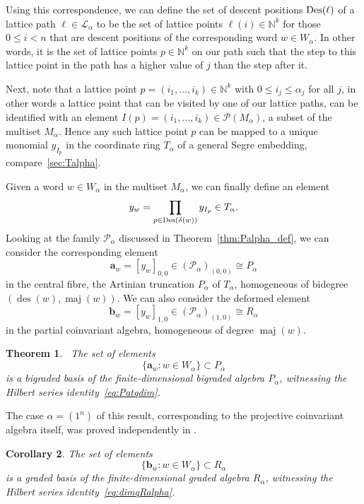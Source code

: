 \documentclass[a4paper,11pt]{amsart}
\theoremstyle{plain}
\newtheorem{theorem}{Theorem}[section]
\newtheorem{corollary}[theorem]{Corollary}
\theoremstyle{definition}
\newcommand{\N}{\mathbb{N}}
\newcommand{\CP}{\mathscr{P}}
\DeclareMathOperator{\maj}{maj}
\DeclareMathOperator{\des}{des}
\begin{document}
Using this correspondence, we can define the set of descent positions ${\rm Des}(\ell)$ of a lattice path $\ell\in{\mathcal L}_\alpha$ to be the set of lattice points $\ell(i)\in \N^k$ for those $0\leq i <n$ that are descent positions of the corresponding word $w\in W_{\alpha}$. In other words, it is the set of lattice points $p\in \N^k$ on our path such that the step to this lattice point in the path has a higher value of $j$ than the step after it. 

Next, note that a lattice point $p=(i_1, \ldots, i_k)\in \N^k$ with $0\leq i_j\leq \alpha_j$ for all $j$, in other
words a lattice point that can be visited by one of our lattice paths, can be identified with an element
$I(p)=(i_1,\ldots, i_k)\in {\mathcal P}(M_\alpha)$, a subset of the multiset $M_\alpha$. Hence any such lattice
point $p$ can be mapped to a unique monomial $y_{I_p}$ in the coordinate ring $T_\alpha$ of a general Segre embedding, 
compare~\ref{sec:Talpha}. 

Given a word $w\in W_\alpha$ in the multiset $M_\alpha$,
we can finally define an element
\[
y_w = \prod_{p\in {\rm Des}(\delta(w))} y_{I_p}\in T_\alpha.
\]
Looking at the family $\CP_\alpha$ discussed in Theorem~\ref{thm:Palpha_def}, we can consider the corresponding element
\[\mathbf{a}_w=[y_w]_{0,0}\in  (\CP_\alpha)_{(0,0)} \cong P_\alpha\] in the central fibre, the Artinian truncation $P_\alpha$ of $T_\alpha$, homogeneous of bidegree $(\des(w), \maj(w))$. We can also consider the deformed element
\[\mathbf{b}_w= [y_w]_{1,0}\in  (\CP_\alpha)_{(1,0)}\cong R_\alpha\]
in the partial coinvariant algebra, homogeneous of degree $\maj(w)$.

\begin{theorem}\!\!\! \cite[Thm.~5.2]{ORS} \ \label{thm_bases} 
The set of elements
\[\{ \mathbf{a}_w: w \in W_\alpha\}\subset P_\alpha
\]
is a bigraded basis of the finite-dimensional bigraded algebra $P_\alpha$, witnessing the Hilbert series identity~\eqref{eq:Patqdim}. 
\end{theorem}
The case $\alpha=(1^n)$ of this result, corresponding to the projective coinvariant algebra itself, was proved independently in \cite[Thm.~4.1]{BO}.

\begin{corollary}
The set of elements
\[\{ \mathbf{b}_w : w \in W_\alpha\}\subset R_\alpha
\]
is a graded basis of the finite-dimensional graded algebra $R_\alpha$, witnessing the Hilbert series identity~\eqref{eq:dimqRalpha}. 
\end{corollary}
\end{document}
